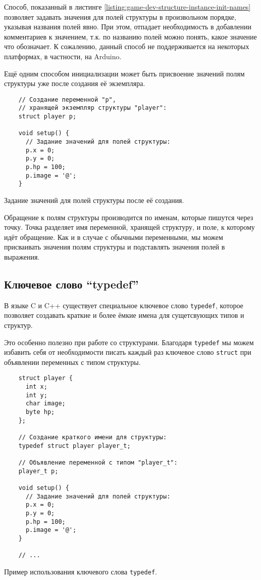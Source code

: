 \documentclass[../sparc.tex]{subfiles}
\begin{document}
Способ, показанный в листинге
\ref{listing:game-dev-structure-instance-init-names} позволяет задавать значения
для полей структуры в произвольном порядке, указывая названия полей явно.  При
этом, отпадает необходимость в добавлении комментариев к значением, т.к. по
названию полей можно понять, какое значение что обозначает.  К сожалению, данный
способ не поддерживается на некоторых платформах, в частности, на Arduino.

Ещё одним способом инициализации может быть присвоение значений полям структуры
уже после создания её экземпляра.

\begin{listing}[H]
  \begin{verbatim}
    // Создание переменной "p",
    // хранящей экземпляр структуры "player":
    struct player p;

    void setup() {
      // Задание значений для полей структуры:
      p.x = 0;
      p.y = 0;
      p.hp = 100;
      p.image = '@';
    }
  \end{verbatim}
  \caption{Задание значений для полей структуры после её создания.}
  \label{listing:game-dev-structure-assignment}
\end{listing}

Обращение к полям структуры производится по именам, которые пишутся через точку.
Точка разделяет имя переменной, хранящей структуру, и поле, к которому идёт
обращение.  Как и в случае с обычными переменными, мы можем присваивать значения
полям структуры и подставлять значения полей в выражения.

\subsection{Ключевое слово ``typedef''}

В языке C и C++ существует специальное ключевое слово \texttt{typedef}, которое
позволяет создавать краткие и более ёмкие имена для сущетсвующих типов и
структур.

Это особенно полезно при работе со структурами.  Благодаря \texttt{typedef} мы
можем избавить себя от необходимости писать каждый раз ключевое слово
\texttt{struct} при объявлении переменных с типом структуры.

\begin{listing}[H]
  \begin{verbatim}
    struct player {
      int x;
      int y;
      char image;
      byte hp;
    };

    // Создание краткого имени для структуры:
    typedef struct player player_t;

    // Объявление переменной с типом "player_t":
    player_t p;

    void setup() {
      // Задание значений для полей структуры:
      p.x = 0;
      p.y = 0;
      p.hp = 100;
      p.image = '@';
    }

    // ...
  \end{verbatim}
  \caption{Пример использования ключевого слова \texttt{typedef}.}
  \label{listing:game-dev-structure-typedef}
\end{listing}
\end{document}
